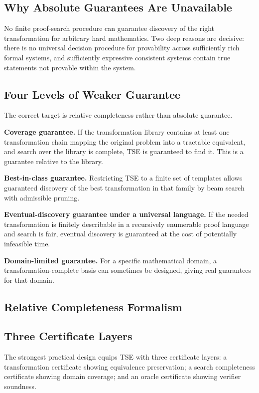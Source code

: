 \subsection{Why Absolute Guarantees Are Unavailable}
No finite proof-search procedure can guarantee discovery of the right transformation for arbitrary hard mathematics. Two deep reasons are decisive: there is no universal decision procedure for provability across sufficiently rich formal systems, and sufficiently expressive consistent systems contain true statements not provable within the system.

\subsection{Four Levels of Weaker Guarantee}
The correct target is relative completeness rather than absolute guarantee.

\textbf{Coverage guarantee.} If the transformation library contains at least one transformation chain mapping the original problem into a tractable equivalent, and search over the library is complete, TSE is guaranteed to find it. This is a guarantee relative to the library.

\textbf{Best-in-class guarantee.} Restricting TSE to a finite set of templates allows guaranteed discovery of the best transformation in that family by beam search with admissible pruning.

\textbf{Eventual-discovery guarantee under a universal language.} If the needed transformation is finitely describable in a recursively enumerable proof language and search is fair, eventual discovery is guaranteed at the cost of potentially infeasible time.

\textbf{Domain-limited guarantee.} For a specific mathematical domain, a transformation-complete basis can sometimes be designed, giving real guarantees for that domain.

\subsection{Relative Completeness Formalism}


\subsection{Three Certificate Layers}
The strongest practical design equips TSE with three certificate layers: a transformation certificate showing equivalence preservation; a search completeness certificate showing domain coverage; and an oracle certificate showing verifier soundness.

